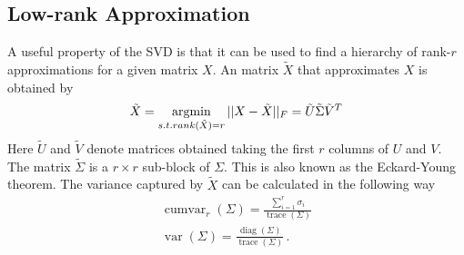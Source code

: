 \subsection{Low-rank Approximation}
A useful property of the SVD is that it can be used to find a hierarchy of rank-\(r\) approximations for a given matrix \(X\).
An matrix \(\tilde{X}\) that approximates \(X\) is obtained by 
\begin{gather}
\tilde{X} = \operatorname*{argmin}\limits_{s.t. rank(\tilde{X}) = r} 
 ||X - \tilde{X}||_F = \tilde{U}\tilde{\Sigma}\tilde{V}^{T}
\end{gather}	
Here  \(\tilde{U}\) and \(\tilde{V}\) denote matrices obtained taking the first \(r\) columns of \(U\) and \(V\). The matrix \(\tilde{\Sigma}\) is a \(r \times r\) sub-block of \(\Sigma\).
This is also known as the Eckard-Young theorem.
The variance captured by \(\tilde{X}\) can be calculated in the following way \cite{brunton_kutz_2019b}
\begin{gather}
\operatorname{cumvar}_{r}(\Sigma) = \frac{\sum_{i = 1}^{r} \sigma_i}{\operatorname{trace}(\Sigma)} \label{cum-var-r} \\
\operatorname{var}(\Sigma) = \frac{\operatorname{diag}(\Sigma)}{\operatorname{trace}(\Sigma)} \,. \label{var-sig}
\end{gather}

